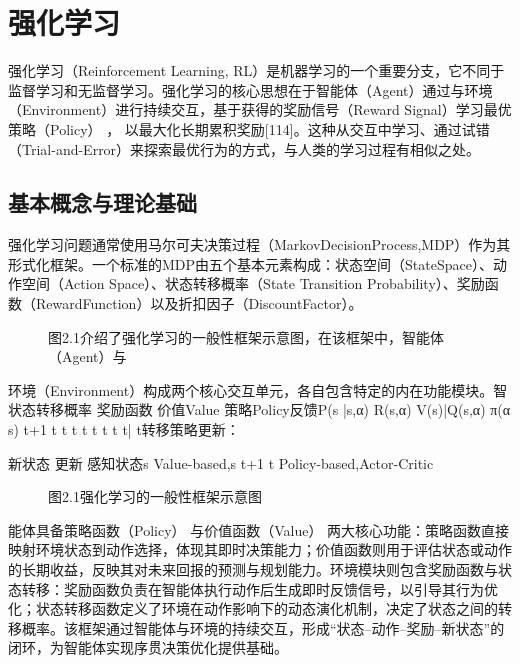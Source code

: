 \documentclass[12pt,a4paper,openright,UTF8]{ctexbook}
\begin{document}
\section{强化学习}

强化学习（Reinforcement Learning, RL）是机器学习的一个重要分支，它不同于监督学习和无监督学习。强化学习的核心思想在于智能体（Agent）通过与环境（Environment）进行持续交互，基于获得的奖励信号（Reward Signal）学习最优策略（Policy） ， 以最大化长期累积奖励[114]。这种从交互中学习、通过试错（Trial-and-Error）来探索最优行为的方式，与人类的学习过程有相似之处。

\subsection{基本概念与理论基础}

强化学习问题通常使用马尔可夫决策过程（MarkovDecisionProcess,MDP）作为其形式化框架。一个标准的MDP由五个基本元素构成：状态空间（StateSpace）、动作空间（Action Space）、状态转移概率（State Transition Probability）、奖励函数（RewardFunction）以及折扣因子（DiscountFactor）。

\begin{figure}[htbp]
\centering
{}
\caption{图2.1介绍了强化学习的一般性框架示意图，在该框架中，智能体（Agent）与}
\end{figure}

环境（Environment）构成两个核心交互单元，各自包含特定的内在功能模块。智状态转移概率 奖励函数 价值Value 策略Policy反馈P(s |s,α) R(s,α) V(s)|Q(s,α) π(α s) t+1 t t t t t t t t| t转移策略更新：


新状态 更新 感知状态s Value-based,s t+1 t Policy-based,Actor-Critic

\begin{figure}[htbp]
\centering
{}
\caption{图2.1强化学习的一般性框架示意图}
\end{figure}

能体具备策略函数（Policy） 与价值函数（Value） 两大核心功能：策略函数直接映射环境状态到动作选择，体现其即时决策能力；价值函数则用于评估状态或动作的长期收益，反映其对未来回报的预测与规划能力。环境模块则包含奖励函数与状态转移：奖励函数负责在智能体执行动作后生成即时反馈信号，以引导其行为优化；状态转移函数定义了环境在动作影响下的动态演化机制，决定了状态之间的转移概率。该框架通过智能体与环境的持续交互，形成“状态–动作–奖励–新状态”的闭环，为智能体实现序贯决策优化提供基础。
\end{document}
